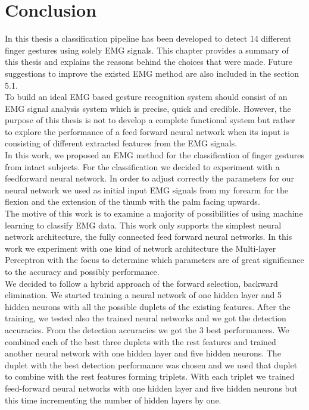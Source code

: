 \chapter{Conclusion}
In this thesis a classification pipeline has been developed to detect 14 different finger gestures using solely EMG signals. This chapter provides a summary of this thesis and explains the reasons behind the choices that were made. Future suggestions to improve the existed EMG method are also included in the section 5.1.\\
To build an ideal EMG based gesture recognition system should consist of an EMG signal analysis system which is precise, quick and credible. However, the purpose of this thesis is not to develop a complete functional system but rather to explore the performance of a feed forward neural network when its input is consisting of different extracted features from the EMG signals. \\ 
In this work, we proposed an EMG method for the classification of finger gestures from intact subjects. For the classification we decided to experiment with a feedforward neural network. In order to adjust correctly the parameters for our neural network we used as initial input EMG signals from my forearm for the flexion and the extension of the thumb with the palm facing upwards.\\
The motive of this work is to examine a majority of possibilities of using machine learning to classify EMG data. This work only supports the simplest neural network architecture, the fully connected feed forward neural networks. In this work we experiment with one kind of network architecture the Multi-layer Perceptron with the focus to determine which parameters are of great significance to the accuracy and possibly performance. \\
We decided to follow a hybrid approach of the forward selection, backward elimination. We started training a neural network of one hidden layer and 5 hidden neurons with all the possible duplets of the existing features. After the training, we tested also the trained neural networks and we got the detection accuracies. From the detection accuracies we got the 3 best performances. We combined each of the best three duplets with the rest features and trained another neural network with one hidden layer and five hidden neurons. The duplet with the best detection performance was chosen and we used that duplet to combine with the rest features forming triplets. With each triplet we trained feed-forward neural networks with one hidden layer and five hidden neurons but this time incrementing the number of hidden layers by one. \\
